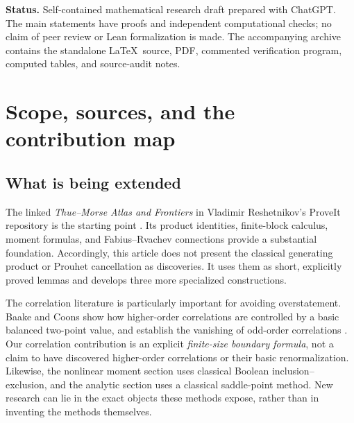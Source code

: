 \documentclass[11pt,oneside]{article}
\numberwithin{equation}{section}
\theoremstyle{definition}
\theoremstyle{remark}
\begin{document}
\begin{titlepage}
\begin{minipage}{0.91\textwidth}
\begin{abstract}
than a certified exhaustive novelty claim.
\end{abstract}
\end{minipage}
\vfill
\begin{minipage}{0.91\textwidth}
\small
\textbf{Status.} Self-contained mathematical research draft prepared with
ChatGPT. The main statements have proofs and independent computational checks;
no claim of peer review or Lean formalization is made. The accompanying archive
contains the standalone \LaTeX\ source, PDF, commented verification program,
computed tables, and source-audit notes.
\end{minipage}
\end{titlepage}

\tableofcontents
\clearpage

\section{Scope, sources, and the contribution map}
\label{sec:scope}

\subsection{What is being extended}
The linked \emph{Thue--Morse Atlas and Frontiers} in Vladimir Reshetnikov's
ProveIt repository is the starting point \cite{atlas}. Its product identities,
finite-block calculus, moment formulas, and Fabius--Rvachev connections provide
a substantial foundation. Accordingly, this article does not present the
classical generating product or Prouhet cancellation as discoveries. It uses
them as short, explicitly proved lemmas and develops three more specialized
constructions.

The correlation literature is particularly important for avoiding overstatement.
Baake and Coons show how higher-order correlations are controlled by a basic
balanced two-point value, and establish the vanishing of odd-order correlations
\cite{baakecoons}. Our correlation contribution is an explicit
\emph{finite-size boundary formula}, not a claim to have discovered higher-order
correlations or their basic renormalization. Likewise, the nonlinear moment
section uses classical Boolean inclusion--exclusion, and the analytic section
uses a classical saddle-point method. New research can lie in the exact objects
these methods expose, rather than in inventing the methods themselves.
\end{document}
